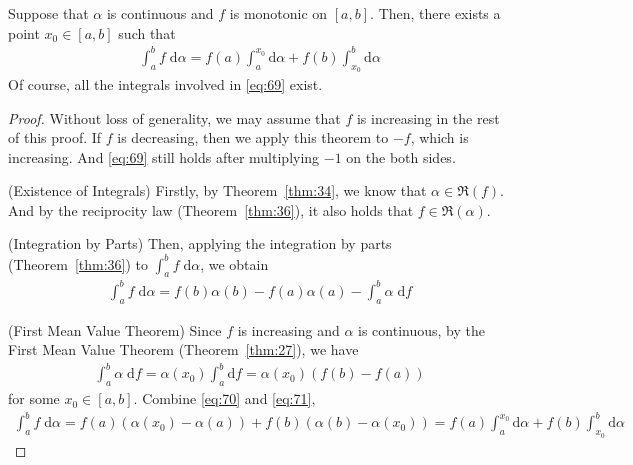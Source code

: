 \documentclass[thmcnt=section, 12pt]{elegantbook}
\begin{document}

\begin{theorem} \label{thm:28}
    Suppose that $\alpha$ is continuous and $f$ is monotonic on $[a, b]$. Then, there exists a point $x_0 \in [a, b]$ such that 
    \begin{align}
        \int_a^b f \; \mathrm{d}\alpha
        = f(a) \int_a^{x_0} \mathrm{d}\alpha
        + f(b) \int_{x_0}^b \mathrm{d}\alpha
        \label{eq:69}
    \end{align}
    Of course, all the integrals involved in \eqref{eq:69} exist.
\end{theorem}

\begin{proof}
    Without loss of generality, we may assume that $f$ is increasing in the rest of this proof. If $f$ is decreasing, then we apply this theorem to $-f$, which is increasing. And \eqref{eq:69} still holds after multiplying $-1$ on the both sides.

    \par (Existence of Integrals) Firstly, by Theorem~\ref{thm:34}, we know that $\alpha \in \mathfrak{R}(f)$. And by the reciprocity law (Theorem~\ref{thm:36}), it also holds that $f \in \mathfrak{R}(\alpha)$. 

    \par (Integration by Parts) Then, applying the integration by parts (Theorem~\ref{thm:36}) to $\int_a^b f \; \mathrm{d}\alpha$, we obtain
    \begin{align}
        \int_a^b f \; \mathrm{d}\alpha
        = f(b)\alpha(b) - f(a)\alpha(a)
        - \int_a^b \alpha \; \mathrm{d}f
        \label{eq:70}
    \end{align}

    \par (First Mean Value Theorem) Since $f$ is increasing and $\alpha$ is continuous, by the First Mean Value Theorem (Theorem~\ref{thm:27}), we have 
    \begin{align}
        \int_a^b \alpha \; \mathrm{d}f
        = \alpha(x_0) \int_a^b \mathrm{d} f
        = \alpha(x_0) ( f(b) - f(a) )
        \label{eq:71}
    \end{align}
    for some $x_0 \in [a, b]$.
    Combine \eqref{eq:70} and \eqref{eq:71}, 
    \begin{align*}
        \int_a^b f \; \mathrm{d}\alpha
        = f(a) (\alpha(x_0) - \alpha(a))
        + f(b) (\alpha(b) - \alpha(x_0))
        = f(a) \int_a^{x_0} \mathrm{d}\alpha
        + f(b) \int_{x_0}^b \mathrm{d}\alpha
    \end{align*}
\end{proof}
\end{document}
